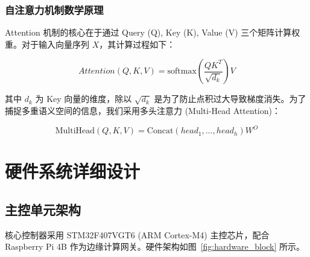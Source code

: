 \subsubsection{自注意力机制数学原理}
Attention 机制的核心在于通过 Query (Q), Key (K), Value (V) 三个矩阵计算权重。对于输入向量序列 $X$，其计算过程如下：

\begin{equation}
    Attention(Q, K, V) = \text{softmax}\left(\frac{QK^T}{\sqrt{d_k}}\right)V
\end{equation}

其中 $d_k$ 为 Key 向量的维度，除以 $\sqrt{d_k}$ 是为了防止点积过大导致梯度消失。为了捕捉多重语义空间的信息，我们采用多头注意力 (Multi-Head Attention)：

\begin{equation}
    \text{MultiHead}(Q, K, V) = \text{Concat}(head_1, \dots, head_h)W^O
\end{equation}

\section{硬件系统详细设计}

\subsection{主控单元架构}
核心控制器采用 STM32F407VGT6 (ARM Cortex-M4) 主控芯片，配合 Raspberry Pi 4B 作为边缘计算网关。硬件架构如图~\ref{fig:hardware_block} 所示。

